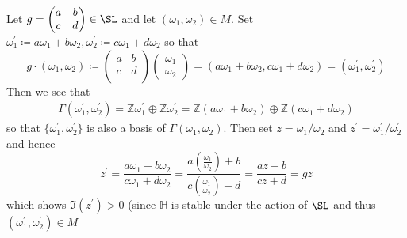 \documentclass[12pt]{article}
\theoremstyle{definition}
\begin{document}
Let \(g = \begin{pmatrix}
    a &  b \\
    c &  d \\
\end{pmatrix} \in \SL\) and let \((\omega _1,\omega _2) \in M\). Set \( \omega_1^{\prime} \coloneqq a \omega _1 + b \omega _2,\omega_2^{\prime} \coloneqq c \omega _1 + d\omega _2 \) so that
\[
    g \cdot (\omega _1,\omega _2) \coloneqq \begin{pmatrix}
        a &  b \\
        c &  d \\
    \end{pmatrix}\begin{pmatrix}
         \omega_1 \\ \omega_2
    \end{pmatrix} = (a \omega _1 + b \omega _2 , c \omega _1 + d\omega _2) = (\omega_1^{\prime} ,\omega _2^{\prime} )
\]  
Then we see that 
\begin{align*}
    \Gamma (\omega _1^{\prime} ,\omega _2^{\prime} ) = \mathbb{Z} \omega _1^{\prime}  \oplus \mathbb{Z} \omega _2^{\prime}  = \mathbb{Z} (a \omega_1 + b \omega _2)  \oplus \mathbb{Z} (c \omega_1 + d \omega _2) 
\end{align*}
so that \(\{ \omega _1^{\prime} ,\omega _2^{\prime}  \} \) is also a basis of \(\Gamma (\omega _1, \omega _2)\). Then set \(z = \omega_1/\omega _2\) and \(z^{\prime} = \omega _1^{\prime} / \omega _2^{\prime} \) and hence
\[
    z^{\prime} = \frac{ a \omega _1 + b \omega _2 }{c \omega _1 + d\omega _2 } = \frac{a \left(\frac{\omega _1}{\omega _2}\right) + b }{ c \left(\frac{\omega _1}{\omega _2}\right) + d} = \frac{az+b}{cz+d} = gz
\]    
which shows \(\Im(z^{\prime} )>0\) (since \(\mathbb{H} \) is stable under the action of \(\SL\) and thus \((\omega _1^{\prime} ,\omega _2^{\prime} )\in M\) 
\end{document}
